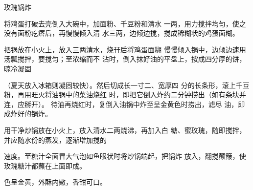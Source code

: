 \begin{recipe}{玫瑰锅炸}

\ingredients



\cooking

\step 将鸡蛋打破去壳倒入大碗中，加面粉、千豆粉和清水 一两，用力搅拌均匀，使之没有面粉疙瘩后，再慢慢倾入清 水三两，边倾边搅，搅成稀糊状的鸡蛋面糊。

\step 把锅放在小火上，放入三两清水，烧幵后将鸡蛋面糊 慢慢倾入锅中，边倾边速用汤瓢搅拌，要搅匀；至浓缩而不 沾时，倒入抹好油的平盘上，按成四分厚的饼，晾冷凝固

（夏天放入冰箱则凝固较快）。然后切成长一寸二、宽厚四 分的长条形，滚上千豆粉，再用旺火将油锅中的菜油烧红 时，即把它倒入炸约二分钟捞出（如有条块并连，应掰开）。 待油再烧红时，复倒入油锅中炸至呈金黄色时捞出，滤尽 油，即成炸好的锅炸。

\step 用干净炒锅放在小火上，放入清水二两烧沸，再加入白 糖、蜜玫瑰，随即搅拌，并应随水份的蒸发，逐渐增加搅的

速度。至糖汁全面冒大气泡如鱼眼状时将炒锅端起，把锅炸 放入，翻搅颠簸，使玫瑰糖汁都蘸在上面即成。

\notes

色呈金黄，外酥内嫩，香甜可口。

\end{recipe}

